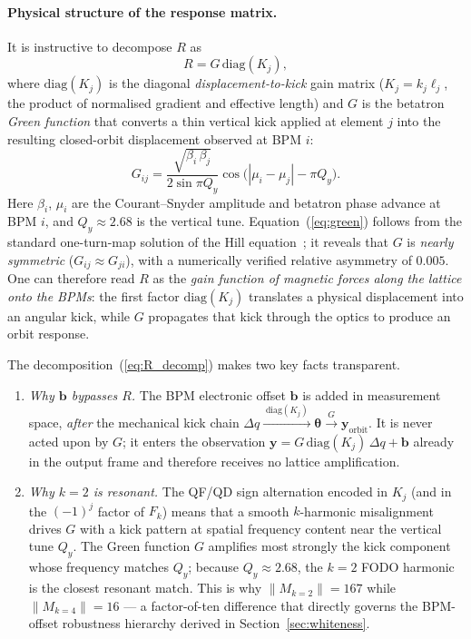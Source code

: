 \documentclass[preprint,12pt]{elsarticle}
\begin{document}
\paragraph{Physical structure of the response matrix.}
It is instructive to decompose $R$ as
\begin{equation}
  R = G\,\mathrm{diag}(K_j),
  \label{eq:R_decomp}
\end{equation}
where $\mathrm{diag}(K_j)$ is the diagonal \emph{displacement-to-kick} gain
matrix ($K_j = k_j\ell_j$, the product of normalised gradient and effective
length) and $G$ is the betatron \emph{Green function} that converts a thin
vertical kick applied at element $j$ into the resulting closed-orbit
displacement observed at BPM $i$:
\begin{equation}
  G_{ij}
  = \frac{\sqrt{\beta_i\,\beta_j}}{2\sin\pi Q_y}
    \cos\!\bigl(|\mu_i-\mu_j|-\pi Q_y\bigr).
  \label{eq:green}
\end{equation}
Here $\beta_i$, $\mu_i$ are the Courant--Snyder amplitude and betatron
phase advance at BPM $i$, and $Q_y\approx2.68$ is the vertical tune.
Equation~(\ref{eq:green}) follows from the standard one-turn-map solution
of the Hill equation~\cite{lee_accel_phys}; it reveals that $G$ is
\emph{nearly symmetric} ($G_{ij}\approx G_{ji}$), with a numerically
verified relative asymmetry of $0.005$.
One can therefore read $R$ as the \emph{gain function of magnetic forces
along the lattice onto the BPMs}: the first factor $\mathrm{diag}(K_j)$
translates a physical displacement into an angular kick, while $G$
propagates that kick through the optics to produce an orbit response.

The decomposition~(\ref{eq:R_decomp}) makes two key facts transparent.
\begin{enumerate}
\item \emph{Why $\mathbf{b}$ bypasses $R$.}
  The BPM electronic offset $\mathbf{b}$ is added in measurement space,
  \emph{after} the mechanical kick chain
  $\Delta q \xrightarrow{\;\mathrm{diag}(K_j)\;} \boldsymbol{\theta}
             \xrightarrow{\;G\;} \mathbf{y}_\mathrm{orbit}$.
  It is never acted upon by $G$; it enters the observation
  $\mathbf{y}=G\,\mathrm{diag}(K_j)\,\Delta q+\mathbf{b}$ already in the
  output frame and therefore receives no lattice amplification.

\item \emph{Why $k=2$ is resonant.}
  The QF/QD sign alternation encoded in $K_j$ (and in the $(-1)^j$ factor of
  $F_k$) means that a smooth $k$-harmonic misalignment drives $G$ with a kick
  pattern at spatial frequency content near the vertical tune $Q_y$.
  The Green function $G$ amplifies most strongly the kick component whose
  frequency matches $Q_y$; because $Q_y\approx2.68$, the $k=2$ FODO harmonic
  is the closest resonant match.
  This is why $\|M_{k=2}\|=167$ while $\|M_{k=4}\|=16$ — a factor-of-ten
  difference that directly governs the BPM-offset robustness hierarchy derived
  in Section~\ref{sec:whiteness}.
\end{enumerate}
\end{document}

